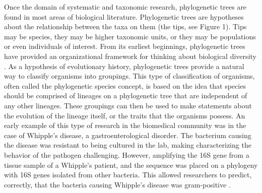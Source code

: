 \documentclass[]{article}
\begin{document}
Once the domain of systematic and taxonomic research, phylogenetic trees are found in most areas of biological literature. 
Phylogenetic trees are hypotheses about the relationship between the taxa on them (the tips, see Figure 1).
Tips may be species, they may be higher taxonomic units, or they may be populations or even individuals of interest.
From its earliest beginnings, phylogenetic trees have provided an organizational framework for thinking about biological diversity \cite{hennig1966}. 
As a hypothesis of evolutionary history, phylogenetic trees provide a natural way to classify organisms \cite{de1992} into groupings. 
This type of classification of organisms, often called the phylogenetic species concept, is based on the idea that species should be comprised of lineages on a phylogenetic tree that are independent of any other lineages.
These groupings can then be used to make statements about the evolution of the lineage itself, or the traits that the organisms possess. 
An early example of this type of research in the biomedical community was in the case of Whipple's disease, a gastroenterological disorder.
The bacterium causing the disease was resistant to being cultured in the lab, making characterizing the behavior of the pathogen challenging.
However, amplifying the 16S gene from a tissue sample of a Whipple's patient, and the sequence was placed on a phylogeny with 16S genes isolated from other bacteria.
This allowed researchers to predict, correctly, that the bacteria causing Whipple's disease was gram-positive \cite{relman1992}. \par
\end{document}
